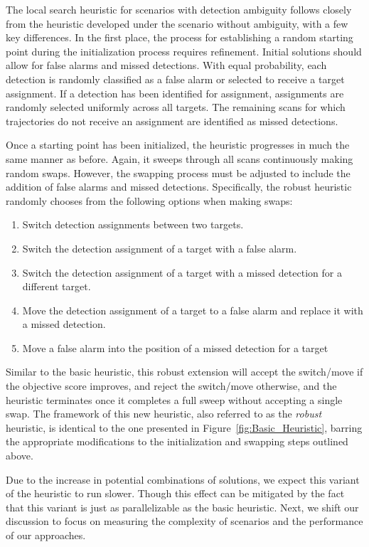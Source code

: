 \vfill
{}\label{sec:Robust_Heuristic}
The local search heuristic for scenarios with detection ambiguity follows closely from the heuristic developed under the scenario without ambiguity, with a few key differences. In the first place, the process for establishing a random starting point during the initialization process requires refinement. Initial solutions should allow for false alarms and missed detections. With equal probability, each detection is randomly classified as a false alarm or selected to receive a target assignment. If a detection has been identified for assignment, assignments are randomly selected uniformly across all targets. The remaining scans for which trajectories do not receive an assignment are identified as missed detections. 

Once a starting point has been initialized, the heuristic progresses in much the same manner as before. Again, it sweeps through all scans continuously making random swaps. However, the swapping process must be adjusted to include the addition of false alarms and missed detections. Specifically, the robust heuristic randomly chooses from the following options when making swaps: 
\begin{enumerate}
  \item Switch detection assignments between two  targets.
  \item Switch the detection assignment of a target with a false alarm.
  \item Switch the detection assignment of a target with a missed detection for a different target.
  \item Move the detection assignment of a target to a false alarm and replace it with a missed detection.
  \item Move a false alarm into the position of a missed detection for a target
\end{enumerate}

Similar to the basic heuristic, this robust extension will accept the switch/move if the objective score improves, and reject the switch/move otherwise, and the heuristic terminates once it completes a full sweep without accepting a single swap. The framework of this new heuristic, also referred to as the \textit{robust} heuristic, is identical to the one presented in Figure~\ref{fig:Basic_Heuristic}, barring the appropriate modifications to the initialization and swapping steps outlined above.  

Due to the increase in potential combinations of solutions, we expect this variant of the heuristic to run slower. Though this effect can be mitigated by the fact that this variant is just as parallelizable as the basic heuristic. Next, we shift our discussion to focus on measuring the complexity of scenarios and the performance of our approaches. 